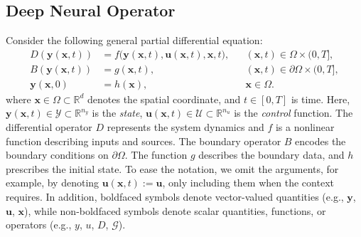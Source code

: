 \documentclass[final,1p,times]{elsarticle}
\theoremstyle{plain} %
\theoremstyle{definition} %
\theoremstyle{remark} %
\begin{document}
\subsection{Deep Neural Operator}
Consider the following general partial differential equation:
\begin{equation}\label{diff}
\begin{aligned}
D(\mathbf{y}(\mathbf{x},t)) 
    &= f\!\bigl(\mathbf{y}(\mathbf{x},t), \mathbf{u}(\mathbf{x},t), \mathbf{x}, t\bigr),
    && (\mathbf{x},t)\in\Omega\times(0,T],\\
B(\mathbf{y}(\mathbf{x},t) )
    &= g(\mathbf{x},t),
    && (\mathbf{x},t)\in\partial\Omega\times(0,T],\\
\mathbf{y}(\mathbf{x},0) 
    &= h(\mathbf{x}),
    && \mathbf{x}\in\Omega.
\end{aligned}
\end{equation}
where $\mathbf{x}\in\Omega\subset\mathbb{R}^d$ denotes the spatial coordinate, and $t\in[0,T]$ is time. Here, $\mathbf{y}(\mathbf{x},t)\in\mathcal{Y}\subset\mathbb{R}^{n_y}$ is the \textit{state}, 
$\mathbf{u}(\mathbf{x},t) \in \mathcal{U} \subset \mathbb{R}^{n_u}$ is the \textit{control} function. The differential operator $D$ represents the system dynamics and
$f$ is a nonlinear function describing inputs and sources. The boundary operator $B$ encodes the boundary conditions on $\partial\Omega$. The function $g$ describes the boundary data, and $h$ prescribes the initial state. To ease the notation, we omit the arguments, for example, by denoting $\mathbf{u}(\mathbf{x},t):=\mathbf{u}$, only including them when the context requires. In addition, boldfaced symbols denote vector-valued quantities (e.g., $\mathbf{y}$, $\mathbf{u}$, $\mathbf{x}$), while non-boldfaced symbols denote scalar quantities, functions, or operators (e.g., $y$, $u$, $D$, $\mathcal{G}$).
\end{document}
